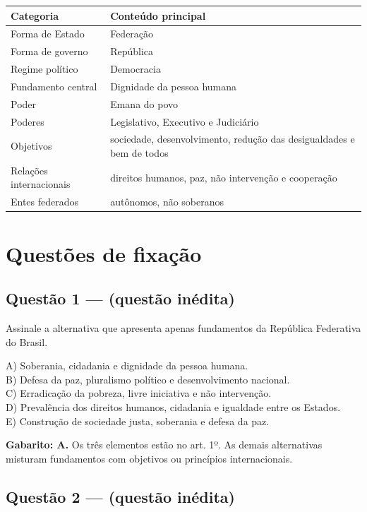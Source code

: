 \documentclass[11pt,a4paper]{article}
\begin{document}
\begin{tabularx}{\linewidth}{lX}
\toprule
 \textbf{Categoria} & \textbf{Conteúdo principal} \\
\midrule
 Forma de Estado & Federação \\
 Forma de governo & República \\
 Regime político & Democracia \\
 Fundamento central & Dignidade da pessoa humana \\
 Poder & Emana do povo \\
 Poderes & Legislativo, Executivo e Judiciário \\
 Objetivos & sociedade, desenvolvimento, redução das desigualdades e bem de todos \\
 Relações internacionais & direitos humanos, paz, não intervenção e cooperação \\
 Entes federados & autônomos, não soberanos \\
\bottomrule
\end{tabularx}


\section*{Questões de fixação}

\subsection*{Questão 1 — (questão inédita)}

Assinale a alternativa que apresenta apenas fundamentos da República Federativa do Brasil.

A) Soberania, cidadania e dignidade da pessoa humana. \\ B) Defesa da paz, pluralismo político e desenvolvimento nacional. \\ C) Erradicação da pobreza, livre iniciativa e não intervenção. \\ D) Prevalência dos direitos humanos, cidadania e igualdade entre os Estados. \\ E) Construção de sociedade justa, soberania e defesa da paz.

\begin{alerta}
\textbf{Gabarito: A.} Os três elementos estão no art. 1º. As demais alternativas misturam fundamentos com objetivos ou princípios internacionais.
\end{alerta}

\subsection*{Questão 2 — (questão inédita)}
\end{document}
